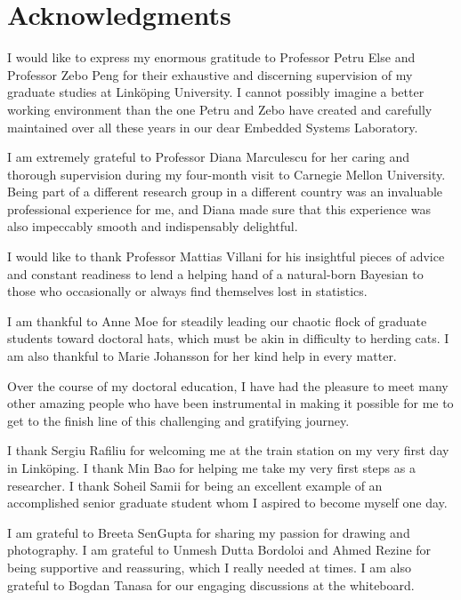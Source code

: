\chapter*{Acknowledgments}
\newcommand\person[2]{#2 #1}

I would like to express my enormous gratitude to Professor \person{Else}{Petru}
and Professor \person{Peng}{Zebo} for their exhaustive and discerning
supervision of my graduate studies at Linköping University. I cannot possibly
imagine a better working environment than the one Petru and Zebo have created
and carefully maintained over all these years in our dear Embedded Systems
Laboratory.

I am extremely grateful to Professor \person{Marculescu}{Diana} for her caring
and thorough supervision during my four-month visit to Carnegie Mellon
University. Being part of a different research group in a different country was
an invaluable professional experience for me, and Diana made sure that this
experience was also impeccably smooth and indispensably delightful.

I would like to thank Professor \person{Villani}{Mattias} for his insightful
pieces of advice and constant readiness to lend a helping hand of a natural-born
Bayesian to those who occasionally or always find themselves lost in statistics.

I am thankful to \person{Moe}{Anne} for steadily leading our chaotic flock of
graduate students toward doctoral hats, which must be akin in difficulty to
herding cats. I am also thankful to \person{Johansson}{Marie} for her kind help
in every matter.

Over the course of my doctoral education, I have had the pleasure to meet many
other amazing people who have been instrumental in making it possible for me to
get to the finish line of this challenging and gratifying journey.

I thank \person{Rafiliu}{Sergiu} for welcoming me at the train station on my
very first day in Linköping. I thank \person{Bao}{Min} for helping me take my
very first steps as a researcher. I thank \person{Samii}{Soheil} for being an
excellent example of an accomplished senior graduate student whom I aspired to
become myself one day.

I am grateful to \person{SenGupta}{Breeta} for sharing my passion for drawing
and photography. I am grateful to \person{Dutta Bordoloi}{Unmesh} and
\person{Rezine}{Ahmed} for being supportive and reassuring, which I really
needed at times. I am also grateful to \person{Tanasa}{Bogdan} for our engaging
discussions at the whiteboard.

